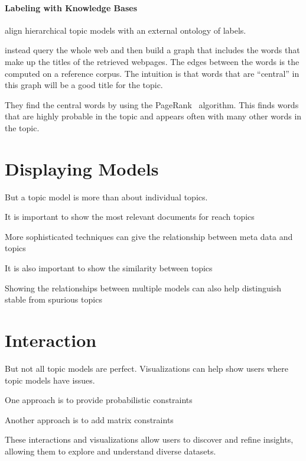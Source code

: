 \paragraph{Labeling with Knowledge Bases}

\citet{magnatti-07} align hierarchical topic models with an external
ontology of labels.

\citet{aleteras-14} instead query the whole web and then build a graph
that includes the words that make up the titles of the retrieved
webpages. The edges between the words is the  computed on a
reference corpus.  The intuition is that words that are ``central'' in
this graph will be a good title for the topic.

They find the central words by using the PageRank~\cite{} algorithm.
This finds words that are highly probable in the topic and appears
often with many other words in the topic.

\section{Displaying Models}

But a topic model is more than about individual topics.

It is important to show the most relevant documents for reach
topics~\citep{chaney-12}

More sophisticated techniques can give the relationship between meta
data and topics~\citep{gardner-10,eistenstein-14}

It is also important to show the similarity between
topics~\citep{chuang-12}

Showing the relationships between multiple models can also help
distinguish stable from spurious topics~\citep{chuang-15} 

\section{Interaction}

But not all topic models are perfect.  Visualizations can help show
users where topic models have issues. 

One approach is to provide probabilistic constraints~\citep{hu-14:itm}

Another approach is to add matrix constraints~\citep{choo-13}

These interactions and visualizations allow users to discover and
refine insights, allowing them to explore and understand diverse
datasets.
